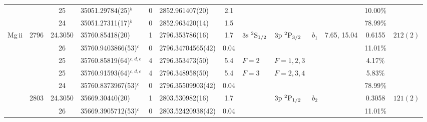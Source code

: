 \begin{table*}
\begin{center}
{\begin{tabular}{:l;l;c;l;c;l;c;l;l;c;c;c;c}
\rowstyle{\itshape}               &        & 25        & 35051.29784(25)$^{b}$            & 0 &   2852.961407(20)  &  2.1 & $                                        $ & $                                        $ & $      $ &              & 10.00\%   & $          $\\
\rowstyle{\itshape}               &        & 24        & 35051.27311(17)$^{b}$            & 0 &   2852.963420(14)  &  1.5 & $                                        $ & $                                        $ & $      $ &              & 78.99\%   & $          $\\
                    Mg{\sc \,ii}  & 2796   & 24.3050   & 35760.85418(20)$^{}$             & 1 &   2796.353786(16)  &  1.7 & $3\rm{s}~^2\rm{S}_{1/2}                  $ & $3\rm{p}~^2\rm{P}_{3/2}                  $ & $b_{1} $ & 7.65, 15.04  & 0.6155    & $  212(2)  $\\
\rowstyle{\itshape}               &        & 26        & 35760.9403866(53)$^{c}$          & 0 & 2796.34704565(42)  & 0.04 & $                                        $ & $                                        $ & $      $ &              & 11.01\%   & $          $\\
\rowstyle{\itshape}               &        & 25        & 35760.85819(64)$^{c,d,e}$        & 4 &   2796.353473(50)  &  5.4 & $F=2                                     $ & $F=1,2,3                                 $ & $      $ &              & 4.17\%    & $          $\\
\rowstyle{\itshape}               &        & 25        & 35760.91593(64)$^{c,d,e}$        & 4 &   2796.348958(50)  &  5.4 & $F=3                                     $ & $F=2,3,4                                 $ & $      $ &              & 5.83\%    & $          $\\
\rowstyle{\itshape}               &        & 24        & 35760.8373967(53)$^{c}$          & 0 & 2796.35509903(42)  & 0.04 & $                                        $ & $                                        $ & $      $ &              & 78.99\%   & $          $\\
                                  & 2803   & 24.3050   & 35669.30440(20)$^{}$             & 1 &   2803.530982(16)  &  1.7 & $                                        $ & $3\rm{p}~^2\rm{P}_{1/2}                  $ & $b_{2} $ &              & 0.3058    & $  121(2)  $\\
\rowstyle{\itshape}               &        & 26        & 35669.3905712(53)$^{c}$          & 0 & 2803.52420938(42)  & 0.04 & $                                        $ & $                                        $ & $      $ &              & 11.01\%   & $          $\\

\end{tabular}}
\end{center}
\end{table*}
